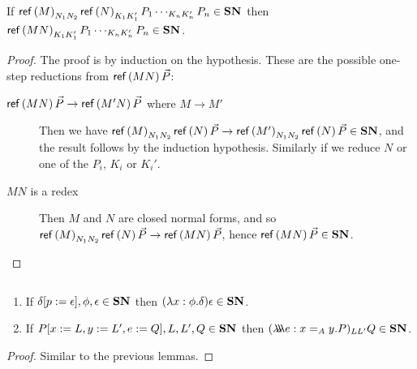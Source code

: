 \begin{lemma}
\label{lm:SNrefapp}
If $\mathsf{ref} \left( {M} \right)_{N_1 N_2} \mathsf{ref} \left( {N} \right)_{K_1 K_1'} P_1 \cdots_{K_n K_n'} P_n \in \mathbf{SN}$ then \\
$\mathsf{ref} \left( {MN} \right)_{K_1 K_1'} P_1 \cdots_{K_n K_n'} P_n \in \mathbf{SN}$.
\end{lemma}

\begin{proof}
The proof is by induction on the hypothesis.  These are the possible one-step reductions from $\mathsf{ref} \left( {MN} \right) \vec{P}$:

\begin{description}
\item[$\mathsf{ref} \left( {MN} \right) \vec{P} \rightarrow \mathsf{ref} \left( {M'N} \right) \vec{P}$ where $M \rightarrow M'$]
Then we have $\mathsf{ref} \left( {M} \right)_{N_1 N_2} \mathsf{ref} \left( {N} \right) \vec{P} \rightarrow \mathsf{ref} \left( {M'} \right)_{N_1 N_2} \mathsf{ref} \left( {N} \right) \vec{P} \in \mathbf{SN}$, and the result follows by the
induction hypothesis.  Similarly if we reduce $N$ or one of the $P_i$, $K_i$ or $K_i'$.

\item[$MN$ is a redex]
Then $M$ and $N$ are closed normal forms, and so \\
$\mathsf{ref} \left( {M} \right)_{N_1 N_2} \mathsf{ref} \left( {N} \right) \vec{P} \rightarrow \mathsf{ref} \left( {MN} \right) \vec{P}$, hence
$\mathsf{ref} \left( {MN} \right) \vec{P} \in \mathbf{SN}$.
\end{description}
\end{proof}

\begin{lemma}
\label{lm:SNothers}
$ $
\begin{enumerate}
\item
If $\delta[p:=\epsilon], \phi, \epsilon \in \mathbf{SN}$ then $(\lambda x:\phi.\delta)\epsilon \in \mathbf{SN}$.
\item
If $P[x:=L, y:=L', e:=Q], L, L', Q \in \mathbf{SN}$ then $(\lambda \!\! \lambda \!\! \lambda e:x =_A y.P)_{L L'} Q \in \mathbf{SN}$.
\end{enumerate}
\end{lemma}

\begin{proof}
Similar to the previous lemmas.
\end{proof}